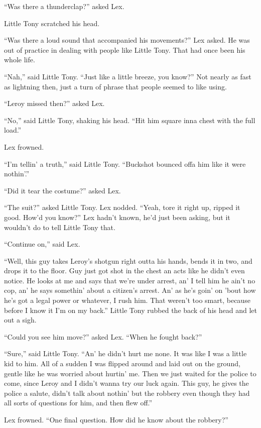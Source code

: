 \documentclass[ebook,12pt]{memoir}
\begin{document}
``Was there a thunderclap?'' asked Lex.

Little Tony scratched his head.

``Was there a loud sound that accompanied his movements?'' Lex asked. He
was out of practice in dealing with people like Little Tony. That had
once been his whole life.

``Nah,'' said Little Tony. ``Just like a little breeze, you know?'' Not
nearly as fast as lightning then, just a turn of phrase that people
seemed to like using.

``Leroy missed then?'' asked Lex.

``No,'' said Little Tony, shaking his head. ``Hit him square inna chest
with the full load.''

Lex frowned.

``I'm tellin' a truth,'' said Little Tony. ``Buckshot bounced offa him
like it were nothin'.''

``Did it tear the costume?'' asked Lex.

``The suit?'' asked Little Tony. Lex nodded. ``Yeah, tore it right up,
ripped it good. How'd you know?'' Lex hadn't known, he'd just been
asking, but it wouldn't do to tell Little Tony that.

``Continue on,'' said Lex.

``Well, this guy takes Leroy's shotgun right outta his hands, bends it
in two, and drops it to the floor. Guy just got shot in the chest an
acts like he didn't even notice. He looks at me and says that we're
under arrest, an' I tell him he ain't no cop, an' he says somethin'
about a citizen's arrest. An' as he's goin' on 'bout how he's got a
legal power or whatever, I rush him. That weren't too smart, because
before I know it I'm on my back.'' Little Tony rubbed the back of his
head and let out a sigh.

``Could you see him move?'' asked Lex. ``When he fought back?''

``Sure,'' said Little Tony. ``An' he didn't hurt me none. It was like I
was a little kid to him. All of a sudden I was flipped around and laid
out on the ground, gentle like he was worried about hurtin' me. Then we
just waited for the police to come, since Leroy and I didn't wanna try
our luck again. This guy, he gives the police a salute, didn't talk
about nothin' but the robbery even though they had all sorts of
questions for him, and then flew off.''

Lex frowned. ``One final question. How did he know about the robbery?''
\end{document}
